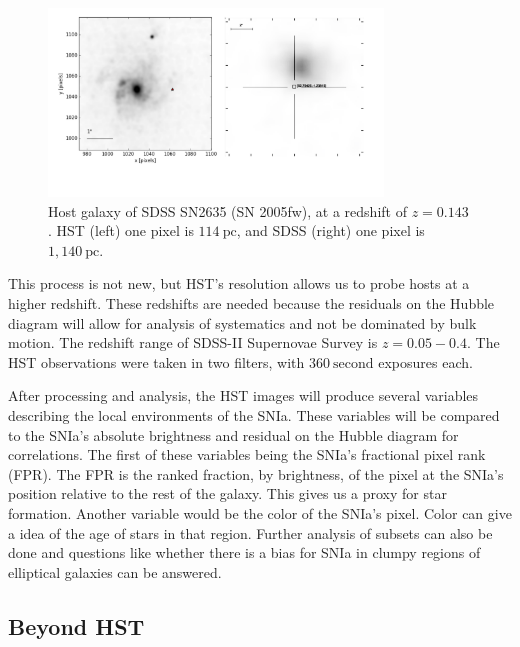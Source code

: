 \documentclass[apj, iop]{emulateapj}
\newcommand{\sn}{SNIa}
\begin{document}
\begin{figure}
	\includegraphics[width=3.5in]{SN2635-combined-inverted.pdf}
	\caption{Host galaxy of SDSS SN2635 (SN 2005fw), at a redshift of $z=0.143$. HST 
	(left) one pixel is $114~\text{pc}$, and SDSS (right) one pixel is $1,140~\text{pc}$.}
	\label{f:galaxy-compare}
\end{figure}

This process is not new, but HST's resolution allows us to probe hosts at a
higher redshift. These redshifts are needed because the residuals on the Hubble
diagram will allow for analysis of systematics and not be dominated by bulk
motion. The redshift range of SDSS-II Supernovae Survey is $z=0.05-0.4$. The HST
observations were taken in two filters, with $360~\text{second}$ exposures each.

After processing and analysis, the HST images will produce several variables
describing the local environments of the \sn{}. These variables will be compared
to the \sn{}'s absolute brightness and residual on the Hubble diagram for
correlations. The first of these variables being the \sn{}'s fractional pixel
rank (FPR). The FPR is the ranked fraction, by brightness, of the pixel at the
\sn{}'s position relative to the rest of the galaxy. This gives us a proxy for
star formation. Another variable would be the color of the \sn{}'s pixel. Color
can give a idea of the age of stars in that region. Further analysis of subsets
can also be done and questions like whether there is a bias for \sn{} in clumpy
regions of elliptical galaxies can be answered.


\subsection{Beyond HST}\label{beyond-hst}
\end{document}
